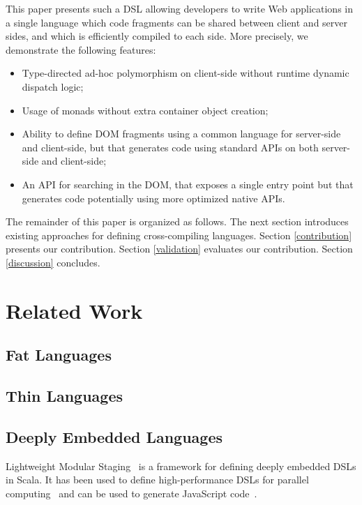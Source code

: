 \documentclass[preprint]{sigplanconf}
\begin{document}
This paper presents such a DSL allowing developers to write Web applications in a single language which code
fragments can be shared between client and server sides, and which is efficiently compiled to each side. More
precisely, we demonstrate the following features:

\begin{itemize}
 \item Type-directed ad-hoc polymorphism on client-side without runtime dynamic dispatch logic;
 \item Usage of monads without extra container object creation;
 \item Ability to define DOM fragments using a common language for server-side and client-side, but that generates
code using standard APIs on both server-side and client-side;
 \item An API for searching in the DOM, that exposes a single entry point but that generates code potentially using
more optimized native APIs.
\end{itemize}

The remainder of this paper is organized as follows. The next section introduces existing approaches for defining
cross-compiling languages. Section \ref{contribution} presents our contribution. Section \ref{validation} evaluates
our contribution. Section \ref{discussion} concludes.

\section{Related Work}

\subsection{Fat Languages}

\subsection{Thin Languages}

\subsection{Deeply Embedded Languages}

Lightweight Modular Staging~\cite{Rompf12_LMSThesis} is a framework for defining deeply embedded DSLs in Scala. It
has been used to define high-performance DSLs for parallel computing~\cite{Brown11_Parallel} and can be used to
generate JavaScript code~\cite{Kossakowski12_JsDESL}.
\end{document}
